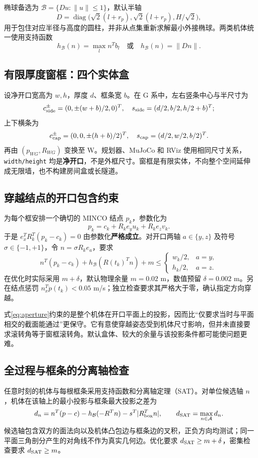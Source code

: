 \documentclass[UTF8,fontset=fandol,a4paper,10pt]{ctexart}
\newcommand{\code}[1]{{\small\nolinkurl{#1}}}
\begin{document}
椭球备选为 $\mathcal B=\{Du:\|u\|\le1\}$，默认半轴
\[
 D=\operatorname{diag}\bigl(\sqrt2(l+r_p),\sqrt2(l+r_p),H/\sqrt2\bigr),
\]
用于包住对应半径与高度的圆柱，并非从点集重新求解最小外接椭球。两类机体统一使用支持函数
\[
 h_{\mathcal B}(n)=\max_l n^Tb_l\quad\text{或}\quad h_{\mathcal B}(n)=\|Dn\|.
\]

\subsection{有限厚度窗框：四个实体盒}
设净开口宽高为 $w,h$，厚度 $d$、框条宽 $b$。在 G 系中，左右竖条中心与半尺寸为
\[
 c_{\rm side}^{\pm}=(0,\pm(w+b)/2,0)^T,\quad
 s_{\rm side}=(d/2,b/2,h/2+b)^T;
\]
上下横条为
\[
 c_{\rm cap}^{\pm}=(0,0,\pm(h+b)/2)^T,\quad
 s_{\rm cap}=(d/2,w/2,b/2)^T.
\]
再由 $(p_{WG},R_{WG})$ 变换至 W。规划器、MuJoCo 和 RViz 使用相同尺寸关系，\code{width/height} 均是\textbf{净开口}，不是外框尺寸。窗框是有限实体，不向整个空间延伸成无限墙，也不构建房间盒或长隧道。

\subsection{穿越结点的开口包含约束}
为每个框安排一个确切的 MINCO 结点 $p_k$，参数化为
\[
 p_k=c_k+R_k e_y u_k+R_k e_z v_k.
\]
于是 $e_x^TR_k^T(p_k-c_k)=0$ 由参数化\textbf{严格成立}。对开口两轴 $a\in\{y,z\}$ 及符号 $\sigma\in\{-1,+1\}$，令 $n=\sigma R_ke_a$，要求
\begin{equation}
 n^T(p_k-c_k)+h_{\mathcal B}(R(t_k)^Tn)+m\le
 \begin{cases}w_k/2,&a=y,\\h_k/2,&a=z.\end{cases}\label{eq:aperture}
\end{equation}
在优化时实际采用 $m+\delta$，默认物理余量 $m=0.02$ m，数值预留 $\delta=0.002$ m。另在结点惩罚 $n_x^T\dot p(t_k)<0.05$ m/s；独立检查要求其严格大于零，确认指定方向穿越。

式\eqref{eq:aperture}约束的是整个机体在开口平面上的投影，因而比“仅要求当时与平面相交的截面能通过”更保守。它有意使穿越姿态受到机体尺寸影响，但并未直接要求滚转角等于窗框滚转角。默认盒体、较大的余量与该投影条件都可能使问题更难。

\subsection{全过程与框条的分离轴检查}
任意时刻的机体与每根框条采用支持函数和分离轴定理（SAT）。对单位候选轴 $n$，机体在该轴上的最小投影与框条最大投影之差为
\[
 d_n=n^T(p-c)-h_{\mathcal B}(-R^Tn)-s^T|R_{\rm box}^Tn|,
 \qquad d_{\rm SAT}=\max_{n\in\mathcal A}d_n.
\]
候选轴包含双方的面法向以及机体凸包边与框条边的叉积，正负方向均测试；同一平面三角剖分产生的对角线不作为真实几何边。优化要求 $d_{\rm SAT}\ge m+\delta$，密集检查要求 $d_{\rm SAT}\ge m$。
\end{document}
